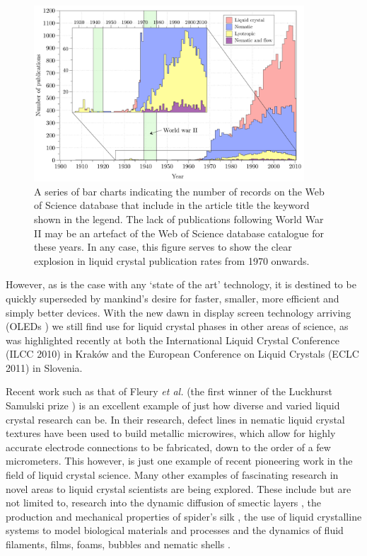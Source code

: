 \begin{figure}
\begin{center}
\includegraphics[width=0.9\textwidth]{figures/introduction/publications.pdf}
\caption[History of publications in the field of liquid crystal science (Source: Web of knowledge)]{\label{fig:web_of_science}A series of bar charts indicating the number of records on the Web of Science database that include in the article title the keyword shown in the legend. The lack of publications following World War II may be an artefact of the Web of Science database catalogue for these years. In any case, this figure serves to show the clear explosion in liquid crystal publication rates from 1970 onwards.}
\end{center}
\end{figure}

However, as is the case with any `state of the art' technology, it is destined to be quickly superseded by mankind's desire for faster, smaller, more efficient and simply better devices. With the new dawn in display screen technology arriving (OLEDs \citep{Burroughes1990}) we still find use for liquid crystal phases in other areas of science, as was highlighted recently at both the International Liquid Crystal Conference (ILCC 2010) in Krak\'{o}w and the European Conference on Liquid Crystals (ECLC 2011) in Slovenia.

Recent work such as that of Fleury \textit{et al.}\cite{Fleury2009} (the first winner of the Luckhurst Samulski prize \cite{Imrie2010}) is an excellent example of just how diverse and varied liquid crystal research can be. In their research, defect lines in nematic liquid crystal textures have been used to build metallic microwires, which allow for highly accurate electrode connections to be fabricated, down to the order of a few micrometers. This however, is just one example of recent pioneering work in the field of liquid crystal science. Many other examples of fascinating research in novel areas to liquid crystal scientists are being explored. These include but are not limited to, research into the dynamic diffusion of smectic layers \cite{Nguyen2010}, the production and  mechanical properties of spider's silk \cite{Vollrath2001,Lydon2004}, the use of liquid crystalline systems to model biological materials and processes \cite{Gupta2005} and the dynamics of fluid filaments, films, foams, bubbles and nematic shells \cite{Muller2007,Bird2010,Fernandez-Nieves2007}.
 
